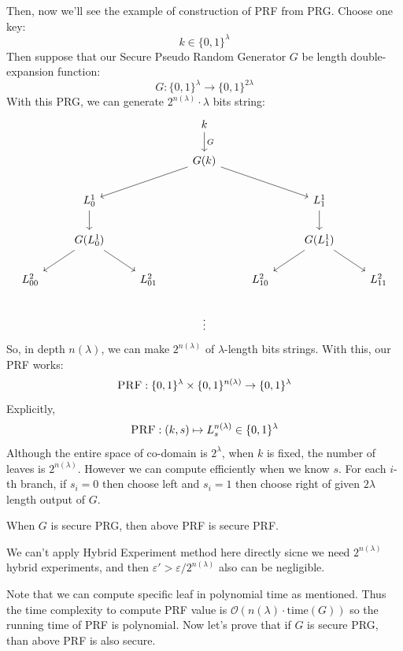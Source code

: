 \documentclass[12pt, a4paper, openany, twoside]{book}
\theoremstyle{definition}
\theoremstyle{remark}
\newcommand{\CO}{{\mathcal {O}}} \newcommand{\CP}{{\mathcal {P}}}
\theoremstyle{plain}
\numberwithin{equation}{section}
\begin{document}
Then, now we'll see the example of construction of PRF from PRG. Choose one key: 
\[k \in \{0, 1\}^{\lambda}\]
Then suppose that our Secure Pseudo Random Generator $G$ be length double-expansion function: 
\[G: \{0, 1\}^\lambda \rightarrow \{0, 1\}^{2\lambda}\]
With this PRG, we can generate $2^{n(\lambda)} \cdot \lambda$ bits string: 
\[
\begin{tikzcd}
 & & & k \arrow[d, "G"] & & & \\
 & & & G(k) \arrow[lld] \arrow[rrd] & & & \\
 & L^1_0 \arrow[d] & & & & L^1_1 \arrow[d] & \\
 & G(L^1_0) \arrow[ld] \arrow[rd] & & & & G(L^1_1) \arrow[ld] \arrow[rd] & \\
 L^2_{00} & & L^2_{01} & & L^2_{10} & & L^2_{11} \\
 & & & \vdots & & & 
\end{tikzcd}
\]
So, in depth $n(\lambda)$, we can make $2^{n(\lambda)}$ of $\lambda$-length bits strings. 
With this, our PRF works: 
\[\textsc{PRF}: \{0, 1\}^\lambda \times \{0, 1\}^{n(\lambda)} \rightarrow \{0, 1\}^\lambda\]
Explicitly, 
\[\textsc{PRF}: (k, s) \mapsto L^{n(\lambda)}_s \in \{0, 1\}^\lambda\]
Although the entire space of co-domain is $2^\lambda$, when $k$ is fixed, the number of leaves is 
$2^{n(\lambda)}$. However we can compute efficiently when we know $s$. For each $i$-th branch, 
if $s_i = 0$ then choose left and $s_i = 1$ then choose right of given $2\lambda$ length output of $G$. 

\begin{tcolorbox}[colback=yellow!10!white,colframe=red!75!black,title=Secure PRG makes Secure PRF]

When $G$ is secure PRG, then above PRF is secure PRF. 

\end{tcolorbox}

\begin{tcolorbox}[colback=yellow!10!white,colframe=gray!75!black,title=Remark]

We can't apply Hybrid Experiment method here directly sicne we need $2^{n(\lambda)}$ hybrid experiments, 
and then $\varepsilon' > \varepsilon / 2^{n(\lambda)}$ also can be negligible. 

\end{tcolorbox}

Note that we can compute specific leaf in polynomial time as mentioned. 
Thus the time complexity to compute PRF value is $\CO(n(\lambda) \cdot \text{time}(G))$ so the running time of 
PRF is polynomial. Now let's prove that if $G$ is secure PRG, than above PRF is also secure. 
\end{document}
